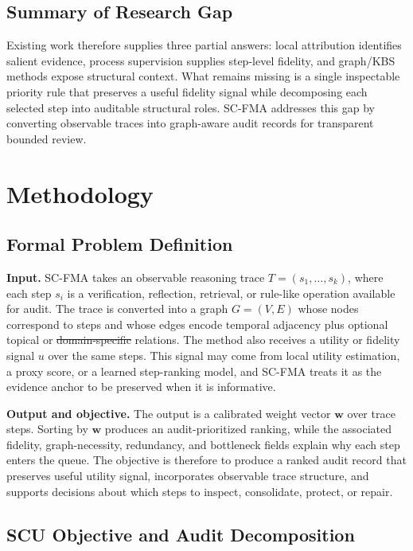 \documentclass[a4paper,fleqn]{cas-sc}
\makeatletter
\newcommand{\domainSpecific}{domain-specific} %
\providecommand{\DIFaddtex}[1]{{\protect\color{blue}\uwave{#1}}} %
\providecommand{\DIFdeltex}[1]{{\protect\color{red}\sout{#1}}} %
\providecommand{\DIFaddbegin}{} %
\providecommand{\DIFaddend}{} %
\providecommand{\DIFdelbegin}{} %
\providecommand{\DIFdelend}{} %
\providecommand{\DIFadd}[1]{\texorpdfstring{\DIFaddtex{#1}}{#1}} %
\providecommand{\DIFdel}[1]{\texorpdfstring{\DIFdeltex{#1}}{}} %
\providecommand{\DIFscaledelfig}{0.5}
\newlength{\DIFdelgraphicswidth} %
\newlength{\DIFdelgraphicsheight} %
\providecommand{\DIFaddincludegraphics}[2][]{{\color{blue}\fbox{\DIFOincludegraphics[#1]{#2}}}} %
\providecommand{\DIFdelincludegraphics}[2][]{%
\sbox{\DIFdelgraphicsbox}{\DIFOincludegraphics[#1]{#2}}%
\settoboxwidth{\DIFdelgraphicswidth}{\DIFdelgraphicsbox} %
\settoboxtotalheight{\DIFdelgraphicsheight}{\DIFdelgraphicsbox} %
\scalebox{\DIFscaledelfig}{%
\parbox[b]{\DIFdelgraphicswidth}{\usebox{\DIFdelgraphicsbox}\\[-\baselineskip] \rule{\DIFdelgraphicswidth}{0em}}\llap{\resizebox{\DIFdelgraphicswidth}{\DIFdelgraphicsheight}{%
\setlength{\unitlength}{\DIFdelgraphicswidth}%
\begin{picture}(1,1)%
\thicklines\linethickness{2pt} %
{\color[rgb]{1,0,0}\put(0,0){\framebox(1,1){}}}%
{\color[rgb]{1,0,0}\put(0,0){\line( 1,1){1}}}%
{\color[rgb]{1,0,0}\put(0,1){\line(1,-1){1}}}%
\end{picture}%
}\hspace*{3pt}}} %
} %
\DeclareRobustCommand{\DIFaddbegin}{\DIFOaddbegin \let\includegraphics\DIFaddincludegraphics} %
\DeclareRobustCommand{\DIFaddend}{\DIFOaddend \let\includegraphics\DIFOincludegraphics} %
\DeclareRobustCommand{\DIFdelbegin}{\DIFOdelbegin \let\includegraphics\DIFdelincludegraphics} %
\DeclareRobustCommand{\DIFdelend}{\DIFOaddend \let\includegraphics\DIFOincludegraphics} %
\let\sout@orig\sout %
\renewcommand{\sout}[1]{\ifmmode\text{\sout@orig{\ensuremath{#1}}}\else\sout@orig{#1}\fi} %
\makeatother
\begin{document}
\subsection{Summary of Research Gap}

Existing work therefore supplies three partial answers: local attribution identifies salient evidence, process supervision supplies step-level fidelity, and graph/KBS methods expose structural context. What remains missing is a single inspectable priority rule that preserves a useful fidelity signal while decomposing each selected step into auditable structural roles. SC-FMA addresses this gap by converting observable traces into graph-aware audit records for transparent bounded review.

\section{Methodology}

\subsection{Formal Problem Definition}

\textbf{Input.} SC-FMA takes an observable reasoning trace $T=(s_1,\ldots,s_k)$, where each step $s_i$ is a verification, reflection, retrieval, or rule-like operation available for audit. The trace is converted into a graph $G=(V,E)$ whose nodes correspond to steps and whose edges encode temporal adjacency plus optional topical or \DIFdelbegin \DIFdel{domain-specific }\DIFdelend \DIFaddbegin \DIFadd{\domainSpecific{} }\DIFaddend relations. The method also receives a utility or fidelity signal $u$ over the same steps. This signal may come from local utility estimation, a proxy score, or a learned step-ranking model, and SC-FMA treats it as the evidence anchor to be preserved when it is informative.

\textbf{Output and objective.} The output is a calibrated weight vector $\mathbf{w}$ over trace steps. Sorting by $\mathbf{w}$ produces an audit-prioritized ranking, while the associated fidelity, graph-necessity, redundancy, and bottleneck fields explain why each step enters the queue. The objective is therefore to produce a ranked audit record that preserves useful utility signal, incorporates observable trace structure, and supports decisions about which steps to inspect, consolidate, protect, or repair.

\subsection{SCU Objective and Audit Decomposition}
\label{sec:scu-objective}
\end{document}
